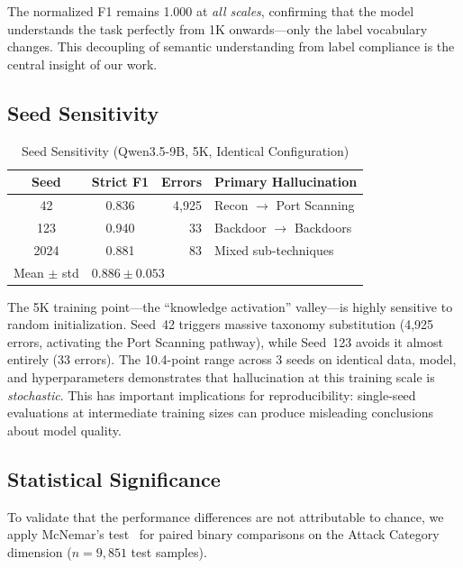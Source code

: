 \documentclass[journal]{IEEEtran}
\begin{document}
The normalized F1 remains 1.000 at \emph{all scales}, confirming that the model understands the task perfectly from 1K onwards---only the label vocabulary changes. This decoupling of semantic understanding from label compliance is the central insight of our work.

\subsection{Seed Sensitivity}

\begin{table}[!ht]
\centering
\caption{Seed Sensitivity (Qwen3.5-9B, 5K, Identical Configuration)}
\label{tab:seed}
\begin{tabular}{ccrl}
\toprule
\textbf{Seed} & \textbf{Strict F1} & \textbf{Errors} & \textbf{Primary Hallucination} \\
\midrule
42 & 0.836 & 4,925 & Recon $\to$ Port Scanning \\
123 & 0.940 & 33 & Backdoor $\to$ Backdoors \\
2024 & 0.881 & 83 & Mixed sub-techniques \\
\midrule
Mean $\pm$ std & \multicolumn{3}{l}{$0.886 \pm 0.053$} \\
\bottomrule
\end{tabular}
\end{table}

The 5K training point---the ``knowledge activation'' valley---is highly sensitive to random initialization. Seed~42 triggers massive taxonomy substitution (4,925 errors, activating the Port Scanning pathway), while Seed~123 avoids it almost entirely (33 errors). The 10.4-point range across 3 seeds on identical data, model, and hyperparameters demonstrates that hallucination at this training scale is \emph{stochastic}. This has important implications for reproducibility: single-seed evaluations at intermediate training sizes can produce misleading conclusions about model quality.

\subsection{Statistical Significance}

To validate that the performance differences are not attributable to chance, we apply McNemar's test~\cite{mcnemar1947} for paired binary comparisons on the Attack Category dimension ($n=9{,}851$ test samples).
\end{document}
